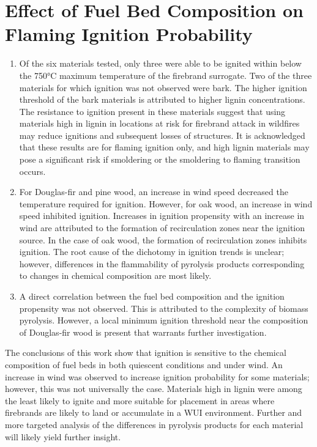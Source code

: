 \section{Effect of Fuel Bed Composition on Flaming Ignition Probability}
        \begin{enumerate}
            \item Of the six materials tested, only three were able to be ignited within below the 750\si{\celsius} maximum temperature of the firebrand surrogate. Two of the three materials for which ignition was not observed were bark. The higher ignition threshold of the bark materials is attributed to higher lignin concentrations. The resistance to ignition present in these materials suggest that using materials high in lignin in locations at risk for firebrand attack in wildfires may reduce ignitions and subsequent losses of structures. It is acknowledged that these results are for flaming ignition only, and high lignin materials may pose a significant risk if smoldering or the smoldering to flaming transition occurs.
            
            \item For Douglas-fir and pine wood, an increase in wind speed decreased the temperature required for ignition. However, for oak wood, an increase in wind speed inhibited ignition. Increases in ignition propensity with an increase in wind are attributed to the formation of recirculation zones near the ignition source. In the case of oak wood, the formation of recirculation zones inhibits ignition. The root cause of the dichotomy in ignition trends is unclear; however, differences in the flammability of pyrolysis products corresponding to changes in chemical composition are most likely.
            
            \item A direct correlation between the fuel bed composition and the ignition propensity was not observed. This is attributed to the complexity of biomass pyrolysis. However, a local minimum ignition threshold near the composition of Douglas-fir wood is present that warrants further investigation. 
        \end{enumerate}
    The conclusions of this work show that ignition is sensitive to the chemical composition of fuel beds in both quiescent conditions and under wind. An increase in wind was observed to increase ignition probability for some materials; however, this was not universally the case. Materials high in lignin were among the least likely to ignite and more suitable for placement in areas where firebrands are likely to land or accumulate in a WUI environment. Further and more targeted analysis of the differences in pyrolysis products for each material will likely yield further insight. 


